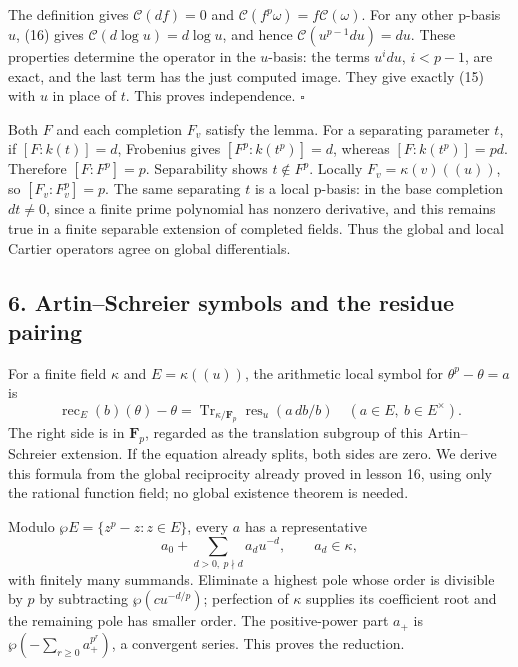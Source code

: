 \documentclass[11pt,a4paper]{article}
\begin{document}
The definition gives \(\mathcal C(df)=0\) and
\(\mathcal C(f^p\omega)=f\mathcal C(\omega)\). For any other p-basis
\(u\), (16) gives \(\mathcal C(d\log u)=d\log u\), and hence
\(\mathcal C(u^{p-1}du)=du\). These properties determine the operator in
the \(u\)-basis: the terms \(u^i du\), \(i<p-1\), are exact, and the
last term has the just computed image. They give exactly (15) with \(u\)
in place of \(t\). This proves independence. \(\square\)

Both \(F\) and each completion \(F_v\) satisfy the lemma. For a
separating parameter \(t\), if \([F:k(t)]=d\), Frobenius gives
\([F^p:k(t^p)]=d\), whereas \([F:k(t^p)]=pd\). Therefore \([F:F^p]=p\).
Separability shows \(t\notin F^p\). Locally \(F_v=\kappa(v)((u))\), so
\([F_v:F_v^p]=p\). The same separating \(t\) is a local p-basis: in the
base completion \(dt\ne0\), since a finite prime polynomial has nonzero
derivative, and this remains true in a finite separable extension of
completed fields. Thus the global and local Cartier operators agree on
global differentials.

\subsection{6. Artin--Schreier symbols and the residue
pairing}\label{artinschreier-symbols-and-the-residue-pairing}

For a finite field \(\kappa\) and \(E=\kappa((u))\), the arithmetic
local symbol for \(\theta^p-\theta=a\) is \[
\operatorname{rec}_E(b)(\theta)-\theta
=\operatorname{Tr}_{\kappa/\mathbf F_p}\operatorname{res}_u(a\,db/b)
\quad(a\in E,\ b\in E^\times).
\tag{19}
\] The right side is in \(\mathbf F_p\), regarded as the translation
subgroup of this Artin--Schreier extension. If the equation already
splits, both sides are zero. We derive this formula from the global
reciprocity already proved in lesson 16, using only the rational
function field; no global existence theorem is needed.

Modulo \(\wp E=\{z^p-z:z\in E\}\), every \(a\) has a representative \[
a_0+\sum_{d>0,\ p\nmid d}a_d u^{-d},
\qquad a_d\in\kappa,
\tag{20}
\] with finitely many summands. Eliminate a highest pole whose order is
divisible by \(p\) by subtracting \(\wp(cu^{-d/p})\); perfection of
\(\kappa\) supplies its coefficient root and the remaining pole has
smaller order. The positive-power part \(a_+\) is
\(\wp(-\sum_{r\geq0}a_+^{p^r})\), a convergent series. This proves the
reduction.
\end{document}
